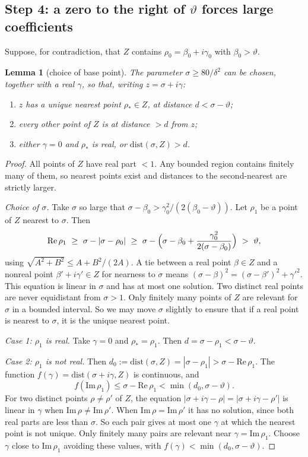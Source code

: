 \documentclass[11pt]{amsart}
\newtheorem{lemma}[theorem]{Lemma}
\theoremstyle{definition}
\theoremstyle{remark}
\begin{document}
\subsection{Step 4: a zero to the right of $\vartheta$ forces large coefficients}
Suppose, for contradiction, that $Z$ contains $\rho_0=\beta_0+i\gamma_0$ with $\beta_0>\vartheta$.

\begin{lemma}[choice of base point]\label{lem:basepoint}
The parameter $\sigma\ge80/\delta^2$ can be chosen, together with a real $\gamma$, so that, writing $z=\sigma+i\gamma$:
\begin{enumerate}[label=(\alph*)]
\item $z$ has a unique nearest point $\rho_*\in Z$, at distance $d<\sigma-\vartheta$;
\item every other point of $Z$ is at distance $>d$ from $z$;
\item either $\gamma=0$ and $\rho_*$ is real, or $\mathrm{dist}(\sigma,Z)>d$.
\end{enumerate}
\end{lemma}

\begin{proof}
All points of $Z$ have real part $<1$. Any bounded region contains finitely many of them, so nearest points exist and distances to the second-nearest are strictly larger.

\emph{Choice of $\sigma$.} Take $\sigma$ so large that $\sigma-\beta_0>\gamma_0^2/(2(\beta_0-\vartheta))$. Let $\rho_1$ be a point of $Z$ nearest to $\sigma$. Then
\[
\mathrm{Re}\,\rho_1\ \ge\ \sigma-|\sigma-\rho_0|\ \ge\ \sigma-\Bigl(\sigma-\beta_0+\frac{\gamma_0^2}{2(\sigma-\beta_0)}\Bigr)\ >\ \vartheta,
\]
using $\sqrt{A^2+B^2}\le A+B^2/(2A)$. A tie between a real point $\beta\in Z$ and a nonreal point $\beta'+i\gamma'\in Z$ for nearness to $\sigma$ means $(\sigma-\beta)^2=(\sigma-\beta')^2+\gamma'^2$. This equation is linear in $\sigma$ and has at most one solution. Two distinct real points are never equidistant from $\sigma>1$. Only finitely many points of $Z$ are relevant for $\sigma$ in a bounded interval. So we may move $\sigma$ slightly to ensure that if a real point is nearest to $\sigma$, it is the unique nearest point.

\emph{Case 1: $\rho_1$ is real.} Take $\gamma=0$ and $\rho_*=\rho_1$. Then $d=\sigma-\rho_1<\sigma-\vartheta$.

\emph{Case 2: $\rho_1$ is not real.} Then $d_0:=\mathrm{dist}(\sigma,Z)=|\sigma-\rho_1|>\sigma-\mathrm{Re}\,\rho_1$. The function $f(\gamma)=\mathrm{dist}(\sigma+i\gamma,Z)$ is continuous, and
\[
f(\mathrm{Im}\,\rho_1)\le\sigma-\mathrm{Re}\,\rho_1<\min(d_0,\sigma-\vartheta).
\]
For two distinct points $\rho\neq\rho'$ of $Z$, the equation $|\sigma+i\gamma-\rho|=|\sigma+i\gamma-\rho'|$ is linear in $\gamma$ when $\mathrm{Im}\,\rho\neq\mathrm{Im}\,\rho'$. When $\mathrm{Im}\,\rho=\mathrm{Im}\,\rho'$ it has no solution, since both real parts are less than $\sigma$. So each pair gives at most one $\gamma$ at which the nearest point is not unique. Only finitely many pairs are relevant near $\gamma=\mathrm{Im}\,\rho_1$. Choose $\gamma$ close to $\mathrm{Im}\,\rho_1$ avoiding these values, with $f(\gamma)<\min(d_0,\sigma-\vartheta)$.
\end{proof}
\end{document}
